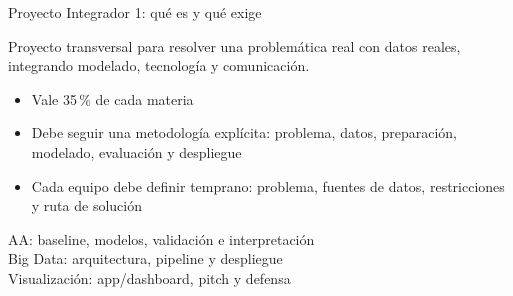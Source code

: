 \documentclass[aspectratio=169,12pt]{beamer}
\begin{document}
\begin{frame}{Proyecto Integrador 1: qué es y qué exige}
  \begin{defbox}
    Proyecto transversal para resolver una problemática real con datos reales, integrando modelado, tecnología y comunicación.
  \end{defbox}
  \begin{itemize}
    \item Vale 35\,\% de cada materia
    \item Debe seguir una metodología explícita: problema, datos, preparación, modelado, evaluación y despliegue
    \item Cada equipo debe definir temprano: problema, fuentes de datos, restricciones y ruta de solución
  \end{itemize}
  \begin{keybox}
    AA: baseline, modelos, validación e interpretación\\
    Big Data: arquitectura, pipeline y despliegue\\
    Visualización: app/dashboard, pitch y defensa
  \end{keybox}
\end{frame}
\end{document}
